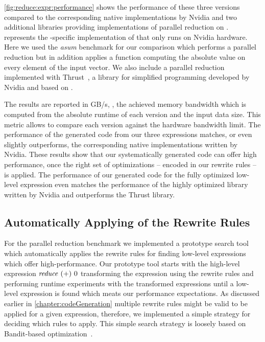 \autoref{fig:reduce:expr:performance} shows the performance of these three versions compared to the corresponding native \OpenCL implementations by Nvidia and two additional libraries providing implementations of parallel reduction on \GPUs.
\CUBLAS~\cite{cuBLAS} represents the \CUDA-specific implementation of \BLAS that only runs on Nvidia hardware.
Here we used the \emph{asum} benchmark for our comparison which performs a parallel reduction but in addition applies a function computing the absolute value on every element of the input vector.
We also include a parallel reduction implemented with Thrust~\cite{BellHo2011}, a library for simplified \GPU programming developed by Nvidia and based on \CUDA.

The results are reported in GB/s, \ie, the achieved memory bandwidth which is computed from the absolute runtime of each version and the input data size.
This metric allows to compare each version against the hardware bandwidth limit.
The performance of the generated \OpenCL code from our three expressions matches, or even slightly outperforms, the corresponding native \OpenCL implementations written by Nvidia.
These results show that our systematically generated code can offer high performance, once the right set of optimizations -- encoded in our rewrite rules -- is applied.
The performance of our generated code for the fully optimized low-level expression even matches the performance of the highly optimized \CUBLAS library written by Nvidia and outperforms the Thrust library.

\subsection{Automatically Applying of the Rewrite Rules}
\label{sec:codeGeneration-evaluation:automatic}

For the parallel reduction benchmark we implemented a prototype search tool which automatically applies the rewrite rules for finding low-level expressions which offer high-performance.
Our prototype tool starts with the high-level expression $\text{\textit{reduce}}\ (+)\ 0$ transforming the expression using the rewrite rules and performing runtime experiments with the transformed expressions until a low-level \OpenCL expression is found which meats our performance expectations.
As discussed earlier in \autoref{chapter:codeGeneration} multiple rewrite rules might be valid to be applied for a given expression, therefore, we implemented a simple strategy for deciding which rules to apply.
This simple search strategy is loosely based on Bandit-based optimization~\cite{MesmayRVP09}.

